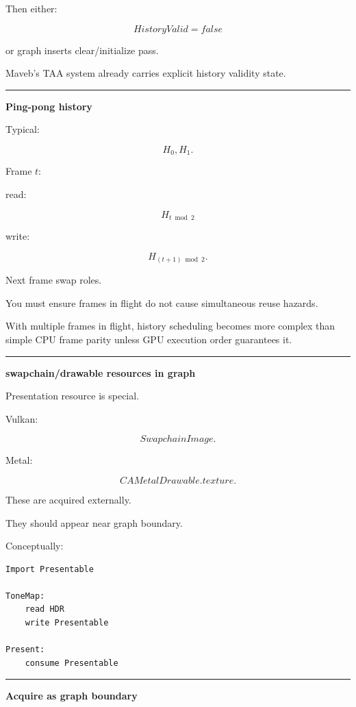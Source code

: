 Then either:

\[
HistoryValid=false
\]

or graph inserts clear/initialize pass.

Maveb's TAA system already carries explicit history validity state.

\begin{center}\rule{0.5\linewidth}{0.5pt}\end{center}

\textbf{Ping-pong history}

Typical:

\[
H_0,H_1.
\]

Frame \(t\):

read:

\[
H_{t\bmod2}
\]

write:

\[
H_{(t+1)\bmod2}.
\]

Next frame swap roles.

You must ensure frames in flight do not cause simultaneous reuse hazards.

With multiple frames in flight, history scheduling becomes more complex than simple CPU frame parity unless GPU execution order guarantees it.

\begin{center}\rule{0.5\linewidth}{0.5pt}\end{center}

\textbf{swapchain/drawable resources in graph}

Presentation resource is special.

Vulkan:

\[
SwapchainImage.
\]

Metal:

\[
CAMetalDrawable.texture.
\]

These are acquired externally.

They should appear near graph boundary.

Conceptually:

\begin{verbatim}
Import Presentable

ToneMap:
    read HDR
    write Presentable

Present:
    consume Presentable
\end{verbatim}

\begin{center}\rule{0.5\linewidth}{0.5pt}\end{center}

\textbf{Acquire as graph boundary}

